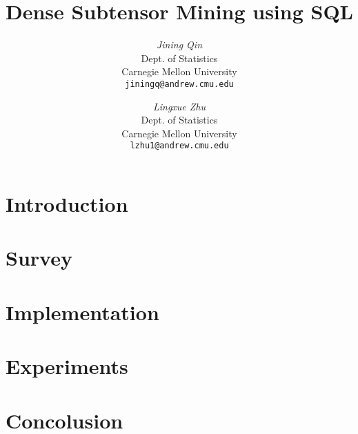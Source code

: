 \documentclass[12pt]{article}
\begin{document}
\newcommand{\beq}{\begin{equation}}
\newcommand{\eeq}{\end{equation}}
\newcommand{\bit}{\begin{itemize*}}
\newcommand{\eit}{\end{itemize*}}
\newcommand{\goal}[1]{ {\noindent {$\Rightarrow$} \em {#1} } }
\newcommand{\hide}[1]{}
\newcommand{\comment}[1]{ {\footnotesize {#1} } }
\newtheorem{lemma}{Lemma}
\newtheorem{theorem}{Theorem}
\newtheorem{proof}{Proof}
\newtheorem{defn}{Definition}
\newtheorem{algo}{Algorithm}
\newtheorem{observation}{Observation}

\title{Dense Subtensor Mining using SQL}


\author{ {\em Jining Qin} \\
	    Dept. of Statistics \\
	    Carnegie Mellon University\\
	    {\tt jiningq@andrew.cmu.edu}
	 \and
	 {\em Lingxue Zhu} \\
	     Dept. of Statistics \\
	    Carnegie Mellon University\\
	     {\tt lzhu1@andrew.cmu.edu}
        }


\maketitle

\section{Introduction}
   \label{sec:introduction} 
   

\section{Survey}
    \label{sec:survey}
    
    
    
\section{Implementation}
    \label{sec:implementation}
    

\section{Experiments}
    \label{sec:experiments}
    
    
% 

\section{Concolusion}
    \label{sec:concolusion}
    



\end{document}
